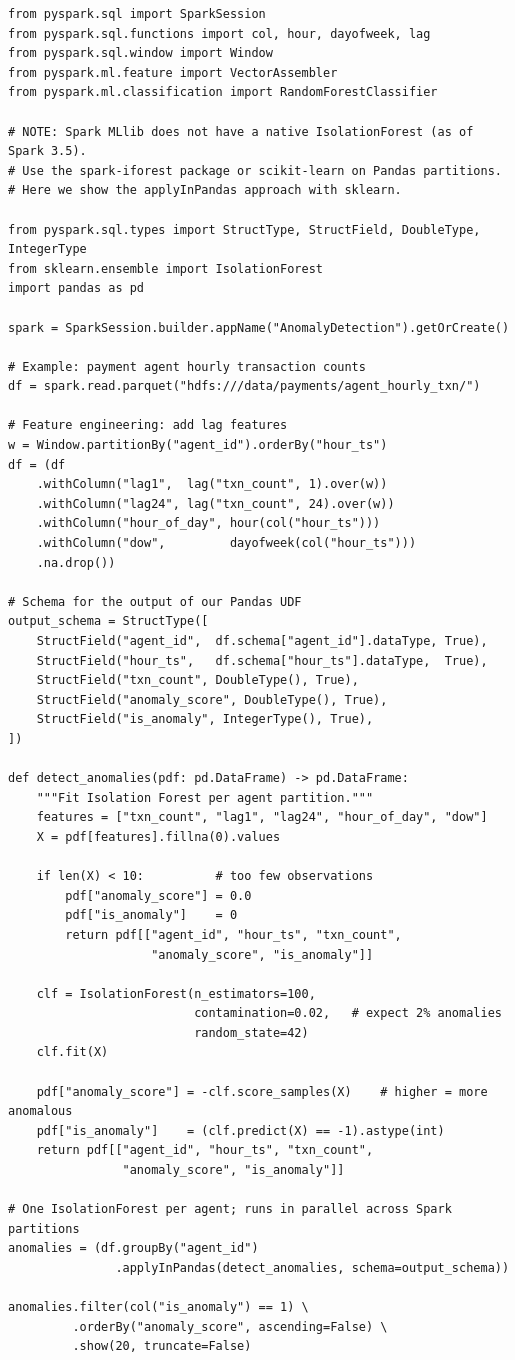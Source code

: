 \begin{lstlisting}[style=pyspark, caption={Anomaly detection with Isolation
  Forest in PySpark MLlib}]
from pyspark.sql import SparkSession
from pyspark.sql.functions import col, hour, dayofweek, lag
from pyspark.sql.window import Window
from pyspark.ml.feature import VectorAssembler
from pyspark.ml.classification import RandomForestClassifier

# NOTE: Spark MLlib does not have a native IsolationForest (as of Spark 3.5).
# Use the spark-iforest package or scikit-learn on Pandas partitions.
# Here we show the applyInPandas approach with sklearn.

from pyspark.sql.types import StructType, StructField, DoubleType, IntegerType
from sklearn.ensemble import IsolationForest
import pandas as pd

spark = SparkSession.builder.appName("AnomalyDetection").getOrCreate()

# Example: payment agent hourly transaction counts
df = spark.read.parquet("hdfs:///data/payments/agent_hourly_txn/")

# Feature engineering: add lag features
w = Window.partitionBy("agent_id").orderBy("hour_ts")
df = (df
    .withColumn("lag1",  lag("txn_count", 1).over(w))
    .withColumn("lag24", lag("txn_count", 24).over(w))
    .withColumn("hour_of_day", hour(col("hour_ts")))
    .withColumn("dow",         dayofweek(col("hour_ts")))
    .na.drop())

# Schema for the output of our Pandas UDF
output_schema = StructType([
    StructField("agent_id",  df.schema["agent_id"].dataType, True),
    StructField("hour_ts",   df.schema["hour_ts"].dataType,  True),
    StructField("txn_count", DoubleType(), True),
    StructField("anomaly_score", DoubleType(), True),
    StructField("is_anomaly", IntegerType(), True),
])

def detect_anomalies(pdf: pd.DataFrame) -> pd.DataFrame:
    """Fit Isolation Forest per agent partition."""
    features = ["txn_count", "lag1", "lag24", "hour_of_day", "dow"]
    X = pdf[features].fillna(0).values

    if len(X) < 10:          # too few observations
        pdf["anomaly_score"] = 0.0
        pdf["is_anomaly"]    = 0
        return pdf[["agent_id", "hour_ts", "txn_count",
                    "anomaly_score", "is_anomaly"]]

    clf = IsolationForest(n_estimators=100,
                          contamination=0.02,   # expect 2% anomalies
                          random_state=42)
    clf.fit(X)

    pdf["anomaly_score"] = -clf.score_samples(X)    # higher = more anomalous
    pdf["is_anomaly"]    = (clf.predict(X) == -1).astype(int)
    return pdf[["agent_id", "hour_ts", "txn_count",
                "anomaly_score", "is_anomaly"]]

# One IsolationForest per agent; runs in parallel across Spark partitions
anomalies = (df.groupBy("agent_id")
               .applyInPandas(detect_anomalies, schema=output_schema))

anomalies.filter(col("is_anomaly") == 1) \
         .orderBy("anomaly_score", ascending=False) \
         .show(20, truncate=False)
\end{lstlisting}

